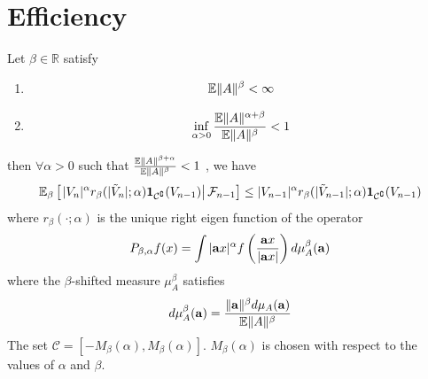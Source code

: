 \documentclass[aoas,preprint]{imsart}
\numberwithin{equation}{section}
\theoremstyle{plain}
\begin{document}
\section{Efficiency}\label{sec:efficiency}
\begin{lemma}
  Let $\beta \in \mathbb R$ satisfy
  \begin{enumerate}
  \item
    \begin{equation}
      \label{eq:drift_cond1}
      \mathbb{E} \|A\|^\beta < \infty      
    \end{equation}
  \item 
    \begin{equation}
      \label{eq:drift_cond2}
    \inf_{\alpha > 0} {\mathbb{E} \|A\|^{\alpha + \beta}
      \over 
      \mathbb{E} \|A\|^{\beta}
    } < 1
    \end{equation}
  \end{enumerate}
  then $\forall \alpha > 0$ such that $\frac{\mathbb{E}\|A\|^{\beta +
      \alpha}}{\mathbb{E}\|A\|^\beta} < 1$ , we have
  \begin{equation}
    \label{eq:drift}
    \mathbb{E}_\beta \left[\left.
        |V_n|^\alpha r_\beta(|\tilde V_n|; \alpha) \mathbf{1}_{{\mathcal C}^\complement}(V_{n-1}) \right|
      \mathcal F_{n-1} \right] \leq |V_{n-1}|^\alpha r_\beta(|\tilde
    V_{n-1}|; \alpha) \mathbf{1}_{{\mathcal C}^\complement}(V_{n-1})
  \end{equation}
  where $r_\beta(\cdot; \alpha)$ is the unique right eigen function of the
  operator
  \[
  P_{\beta, \alpha} f(x) = \int |\mathbf a x|^\alpha f\left(
    {\mathbf a x \over |\mathbf a x|}
  \right) d\mu_A^\beta(\mathbf a)
  \]
  where the $\beta$-shifted measure $\mu_A^\beta$ satisfies
  \[
  d\mu_A^\beta(\mathbf a) = {\|\mathbf a\|^\beta d\mu_A(\mathbf a) \over \mathbb{E}\|A\|^\beta}
  \]
  The set $\mathcal C = [-M_\beta(\alpha),
  M_\beta(\alpha)]$. $M_\beta(\alpha)$ is chosen with respect to the
  values of $\alpha$ and $\beta$.
\end{lemma}
\end{document}
